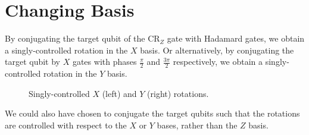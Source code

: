\section{Changing Basis}

By conjugating the target qubit of the CR$_Z$ gate with Hadamard gates, we obtain a singly-controlled rotation in the $X$ basis. Or alternatively, by conjugating the target qubit by $X$ gates with phases $\frac{\pi}{2}$ and $\frac{3\pi}{2}$ respectively, we obtain a singly-controlled rotation in the $Y$ basis.

\begin{figure}[H]
    \centering
    \caption{Singly-controlled $X$ (left) and $Y$ (right) rotations.}
\end{figure}

We could also have chosen to conjugate the target qubits such that the rotations are controlled with respect to the $X$ or $Y$ bases, rather than the $Z$ basis.




